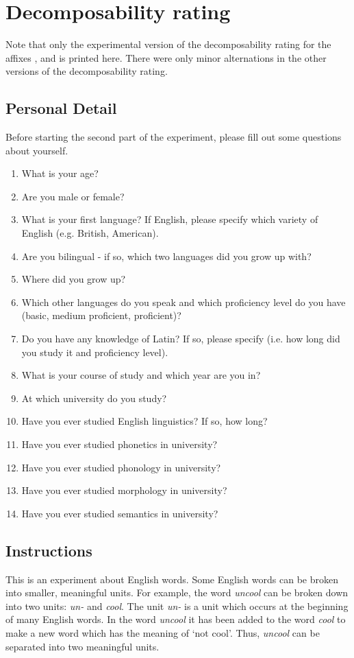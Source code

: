 
\appendix
\addappheadtotoc

\appendixpage

\chapter{Decomposability rating}\label{Appendix A: Decomposability Rating}
Note that only the experimental version of the {decomposability rating} for the affixes ,  and  is printed here. There were only minor alternations in the other versions of the {decomposability rating}.
\section{Personal Detail}
Before starting the second part of the experiment, please fill out some questions about yourself.

\begin{enumerate}
	\item What is your age?
	\item Are you male or female?
	\item What is your first language?  If English, please specify which variety of English (e.g. British, American).	
	\item Are you bilingual - if so, which two languages did you grow up with?	
	\item Where did you grow up?
	\item Which other languages do you speak and which proficiency level do you have (basic, medium proficient, proficient)?
	\item Do you have any knowledge of Latin? If so, please specify (i.e. how long did you study it and proficiency level).
	\item What is your course of study and which year are you in?
	\item At which university do you study?
	\item Have you ever studied English linguistics? If so, how long?
	\item Have you ever studied phonetics in university?
	\item Have you ever studied phonology in university?
	\item Have you ever studied morphology in university?
	\item Have you ever studied semantics in university?
\end{enumerate}
\section{Instructions}
 This is an experiment about English words. Some English words can be broken into smaller, meaningful units.
For example, the word \textit{uncool} can be broken down into two units: \textit{un-} and \textit{cool}. The unit \textit{{un-} }is a unit which occurs at the beginning of many English words. In the word \textit{uncool} it has been added to the word \textit{cool} to make a new word which has the meaning of ‘not cool’. Thus, \textit{uncool} can be separated into two meaningful units.

